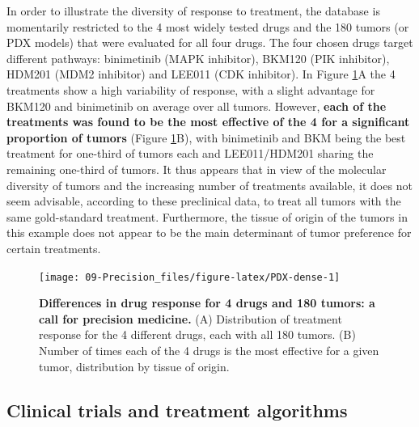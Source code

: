 \documentclass[a4paper,12pt,twoside,onecolumn,openright,final,oldfontcommands]{memoir}
\begin{document}
In order to illustrate the diversity of response to treatment, the
database is momentarily restricted to the 4 most widely tested drugs and
the 180 tumors (or PDX models) that were evaluated for all four drugs.
The four chosen drugs target different pathways: binimetinib (MAPK
inhibitor), BKM120 (PIK inhibitor), HDM201 (MDM2 inhibitor) and LEE011
(CDK inhibitor). In Figure \ref{fig:PDX-dense}A the 4 treatments show a
high variability of response, with a slight advantage for BKM120 and
binimetinib on average over all tumors. However, \textbf{each of the
treatments was found to be the most effective of the 4 for a significant
proportion of tumors} (Figure \ref{fig:PDX-dense}B), with binimetinib
and BKM being the best treatment for one-third of tumors each and
LEE011/HDM201 sharing the remaining one-third of tumors. It thus appears
that in view of the molecular diversity of tumors and the increasing
number of treatments available, it does not seem advisable, according to
these preclinical data, to treat all tumors with the same gold-standard
treatment. Furthermore, the tissue of origin of the tumors in this
example does not appear to be the main determinant of tumor preference
for certain treatments.

\begin{figure}

{\centering \texttt{[image: 09-Precision\_files/figure-latex/PDX-dense-1]} 

}

\caption[Differences in drug response for 4 drugs and 180 tumors: a call for precision medicine]{\textbf{Differences in drug response for 4 drugs
and 180 tumors: a call for precision medicine.} (A) Distribution of
treatment response for the 4 different drugs, each with all 180 tumors.
(B) Number of times each of the 4 drugs is the most effective for a
given tumor, distribution by tissue of origin.}\label{fig:PDX-dense}
\end{figure}







\subsection{Clinical trials and treatment
algorithms}\label{clinical-trials-and-treatment-algorithms}
\end{document}
